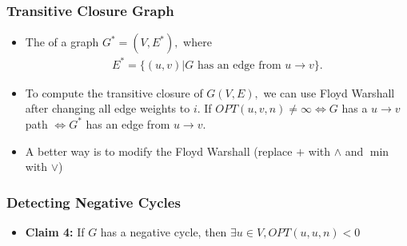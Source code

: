 \documentclass[a4paper,12pt]{article}
\begin{document}
\subsubsection{Transitive Closure Graph}
\begin{itemize}
    \item The  of a graph $G^*=(V,E^*),$ where \begin{align}
        E^*=\{(u,v)|G\text{ has an edge from $u\to v$}\}.
    \end{align}
    \item To compute the transitive closure of $G(V,E),$ we can use Floyd Warshall after changing all edge weights to $i.$ If $OPT(u,v,n)\neq\infty\iff G$ has a $u\to v$ path $\iff G^*$ has an edge from $u\to v.$
    \item A better way is to modify the Floyd Warshall (replace $+$ with $\land$ and $\min$ with $\lor$)
\end{itemize}
\subsubsection{Detecting Negative Cycles}
\begin{itemize}
    \item \textbf{Claim 4:} If $G$ has a negative cycle, then $\exists u\in V,OPT(u,u,n)<0$ 
\end{itemize}
\end{document}
